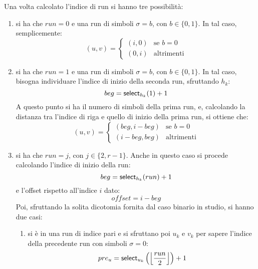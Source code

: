 Una volta calcolato l'indice di run si hanno tre possibilità:
\begin{enumerate}
  \item si ha che $run=0$ e una run di simboli $\sigma=b$, con $b\in\{0,1\}$. 
  In tal caso, semplicemente:
  \begin{equation}
    \label{eq:bv8}
    (u,v)=
    \begin{cases}
      (i,0)&\mbox{se } b=0\\
      (0,i)&\mbox{altrimenti}
    \end{cases}
  \end{equation}
  \item si ha che $run=1$ e una run di simboli $\sigma=b$, con $b\in\{0,1\}$. In
  tal caso, bisogna individuare l'indice di inizio della seconda
  run, sfruttando $h_k$:
  \begin{equation}
    \label{eq:bv9}
    beg = \mbox{\rm {\sf select}}_{h_k}(1)+1
  \end{equation}
  A questo punto si ha il numero di simboli della prima run, e,
  calcolando la distanza tra l'indice di riga e quello di inizio della prima
  run, si ottiene che:
  \begin{equation}
    \label{eq:bv10}
    (u,v)=
    \begin{cases}
      (beg,i-beg)&\mbox{se } b=0\\
      (i-beg,beg)&\mbox{altrimenti}
    \end{cases}
  \end{equation}
  \item si ha che $run=j$, con $j\in\{2,r-1\}$. Anche in questo caso si procede
  calcolando l'indice di inizio della run:
  \begin{equation}
    \label{eq:bv11}
    beg = \mbox{\rm {\sf select}}_{h_k}(run)+1
  \end{equation}
  e l'offset rispetto all'indice $i$ dato:
  \begin{equation}
    \label{eq:bv12}
    offset = i-beg
  \end{equation}
  Poi, sfruttando la solita dicotomia fornita dal caso binario in studio, si
  hanno due casi: 
  \begin{enumerate}
    \item si è in una run di indice pari e si sfruttano poi $u_k$ e $v_k$ per
    sapere l'indice della precedente run con 
    simboli $\sigma=0$:
    \begin{equation}
      \label{eq:bv13}
      pre_u=\mbox{\rm {\sf select}}_{u_k}\left(\left\lfloor\frac{run}{2}\right\rfloor\right)+1
    \end{equation}

\end{enumerate}
\end{enumerate}
